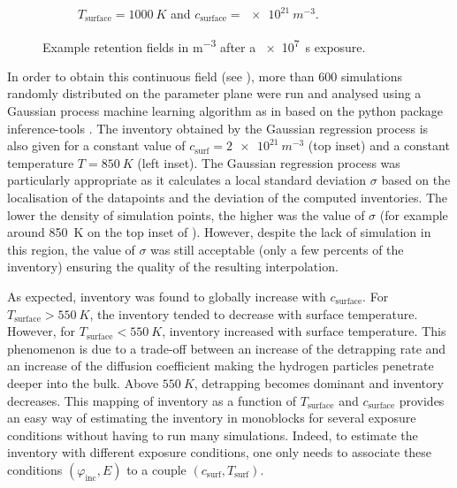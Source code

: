 \begin{figure}
\begin{subfigure}{0.5\linewidth}
        \caption{$T_\mathrm{surface} = \SI{1000}{K}$ and $c_\mathrm{surface} = \SI{e21}{m^{-3}}$.}
    \end{subfigure}
    \caption{Example retention fields in \si{m^{-3}} after a \SI{e7}{s} exposure.}
\end{figure}


In order to obtain this continuous field (see ), more than 600 simulations randomly distributed on the parameter plane were run and analysed using a Gaussian process machine learning algorithm  as in  based on the python package inference-tools .
The inventory obtained by the Gaussian regression process is also given for a constant value of $c_\mathrm{surf}=\SI{2e21}{m^{-3}}$ (top inset) and a constant temperature $T=\SI{850}{K}$ (left inset).
The Gaussian regression process was particularly appropriate as it calculates a local standard deviation $\sigma$ based on the localisation of the datapoints and the deviation of the computed inventories.
The lower the density of simulation points, the higher was the value of $\sigma$ (for example around \SI{850}{K} on the top inset of ).
However, despite the lack of simulation in this region, the value of $\sigma$ was still acceptable (only a few percents of the inventory) ensuring the quality of the resulting interpolation.

As expected, inventory was found to globally increase with $c_\mathrm{surface}$.
For $T_\mathrm{surface} > \SI{550}{K}$, the inventory tended to decrease with surface temperature.
However, for $T_\mathrm{surface} < \SI{550}{K}$, inventory increased with surface temperature.
This phenomenon is due to a trade-off between an increase of the detrapping rate and an increase of the diffusion coefficient making the hydrogen particles penetrate deeper into the bulk.
Above $\SI{550}{K}$, detrapping becomes dominant and inventory decreases.
This mapping of inventory as a function of $T_\mathrm{surface}$ and $c_\mathrm{surface}$ provides an easy way of estimating the inventory in monoblocks for several exposure conditions without having to run many simulations.
Indeed, to estimate the inventory with different exposure conditions, one only needs to associate these conditions $(\varphi_\mathrm{inc}, E)$ to a couple $(c_\mathrm{surf}, T_\mathrm{surf})$.

